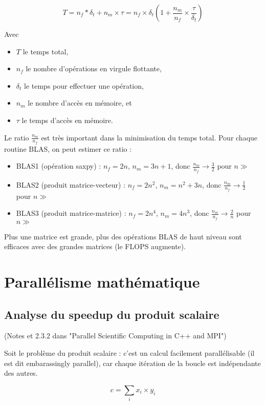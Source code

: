 	$$T = n_f * \delta_t + n_m \times \tau = n_f \times \delta_t (1 + \frac{n_m}{n_f} \times \frac{\tau}{\delta_t})$$
	
	Avec
	
	\begin{itemize}
		\item $T$ le temps total,
		\item $n_f$ le nombre d'opérations en virgule flottante,
		\item $\delta_t$ le temps pour effectuer une opération,
		\item $n_m$ le nombre d'accès en mémoire, et
		\item $\tau$ le temps d'accès en mémoire.
	\end{itemize}
	
	Le ratio $\frac{n_m}{n_f}$ est très important dans la minimisation du temps total. Pour chaque routine BLAS, on peut estimer ce ratio :
	
	\begin{itemize}
		\item BLAS1 (opération saxpy) : $n_f = 2n$, $n_m = 3n + 1$, donc $\frac{n_m}{n_f} \rightarrow \frac{3}{2}$ pour $n \gg$
		\item BLAS2 (produit matrice-vecteur) : $n_f = 2n^2$, $n_m = n^2 + 3n$, donc $\frac{n_m}{n_f} \rightarrow \frac{1}{2}$ pour $n \gg$
		\item BLAS3 (produit matrice-matrice) : $n_f = 2n^4$, $n_m = 4n^3$, donc $\frac{n_m}{n_f} \rightarrow \frac{2}{n}$ pour $n \gg$
	\end{itemize}
	
	Plus une matrice est grande, plus des opérations BLAS de haut niveau sont efficaces avec des grandes matrices (le FLOPS augmente).
	
	
\section{Parallélisme mathématique}

	\subsection{Analyse du speedup du produit scalaire}
(Notes et 2.3.2 dans "Parallel Scientific Computing in C++ and MPI")

Soit le problème du produit scalaire : c'est un calcul facilement parallélisable (il est dit embarassingly parallel), car chaque itération de la boucle est indépendante des autres.

$$c = \sum_i x_i \times y_i$$

